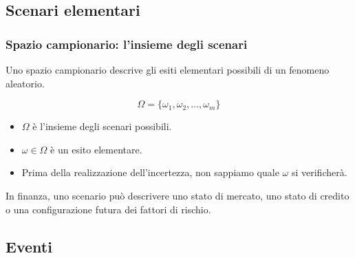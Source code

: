 \documentclass[handout]{beamer}%
\newenvironment{stepitemize}{\begin{itemize}[<+->]}{\end{itemize} }
\providecommand{\1}{\mathbf{1}}
\providecommand{\QTR}[2]{\csname #1\endcsname{#2}}
\begin{document}
\subsection{Scenari elementari}%

\begin{frame}%
%

\frametitle{Spazio campionario: l'insieme degli scenari}%


Uno spazio campionario descrive gli esiti elementari possibili di un fenomeno aleatorio.

\medskip%

\[
\Omega=\{\omega_{1},\omega_{2},\ldots,\omega_{m}\}
\]


\medskip

\begin{stepitemize}


\item $\Omega$ \`{e} l'insieme degli scenari possibili.

\item $\omega\in\Omega$ \`{e} un esito elementare.

\item Prima della realizzazione dell'incertezza, non sappiamo quale $\omega$
si verificher\`{a}.
\end{stepitemize}

\medskip

\begin{center}
{\small In finanza, uno scenario pu\`{o} descrivere uno stato di mercato, uno
stato di credito o una configurazione futura dei fattori di rischio.}
\end{center}%

\transboxout
\end{frame}%




\subsection{Eventi}%
\end{document}
